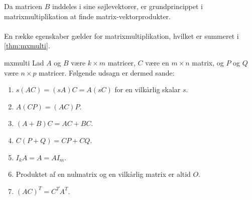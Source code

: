 Da matricen $B$ inddeles i sine søjlevektorer, er grundprincippet i matrixmultiplikation at finde matrix-vektorprodukter.\\\\
En række egenskaber gælder for matrixmultiplikation, hvilket er summeret i \ref{thm:mxmulti}.
%
\begin{thm}{}{mxmulti}
Lad $A$ og $B$ være $k \times m$ matricer, $C$ være en $m \times n$ matrix, og $P$ og $Q$ være $n \times p$ matricer. Følgende udsagn er dermed sande:
\begin{enumerate}[label=(\alph*)]
\item $s(AC)=(sA)C=A(sC)$ for en vilkårlig skalar $s$.
\item $A(CP)=(AC)P$.
\item $(A+B)C=AC+BC$.
\item $C(P+Q)=CP+CQ$.
\item $I_kA=A=AI_m$.
\item Produktet af en nulmatrix og en vilkårlig matrix er altid $O$.
\item $(AC)^T=C^TA^T$.
\end{enumerate}
\end{thm}
